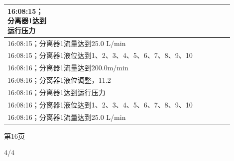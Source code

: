 \documentclass[UTF8,10pt,a4paper,fontset=fandol]{ctexart}
\newcommand{\fieldvalue}[1]{#1}
\newcommand{\handwritten}[1]{#1}
\begin{document}
\begin{center}
\begin{minipage}[t]{0.47\linewidth}
\begin{tabular}{|p{0.18\linewidth}|p{0.72\linewidth}|}
{\fieldvalue{16:08:15；分离器1达到运行压力}} \\ \hline
\multicolumn{2}{|l|}{
\fieldvalue{16:08:15；分离器1流量达到25.0 L/min}} \\ \hline
\multicolumn{2}{|l|}{
\fieldvalue{16:08:15；分离器1液位达到1、2、3、4、5、6、7、8、9、10}} \\ \hline
\multicolumn{2}{|l|}{
\fieldvalue{16:08:16；分离器1流量达到200.0m/min}} \\ \hline
\multicolumn{2}{|l|}{
\fieldvalue{16:08:16；分离器1液位调整，11.2}} \\ \hline
\multicolumn{2}{|l|}{
\fieldvalue{16:08:16；分离器1达到运行压力}} \\ \hline
\multicolumn{2}{|l|}{
\fieldvalue{16:08:16；分离器1液位达到1、2、3、4、5、6、7、8、9、10}} \\ \hline
\multicolumn{2}{|l|}{
\fieldvalue{16:08:16；分离器1流量达到25.0 L/min}} \\ \hline
\end{tabular}

\vspace{1mm}
第16页
\end{minipage}
\end{center}

\handwritten{4/4}

\newpage
\end{document}
